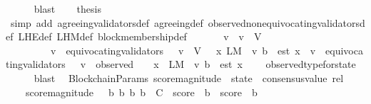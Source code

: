 \begin{isabellebody}
\ \ \ \ \isamarkupfalse%
\ blast\isanewline
\ \ \isamarkupfalse%
\ {\isacharquery}thesis\isanewline
\ \ \ \ \isamarkupfalse%
\ {\isacharparenleft}simp\ add{\isacharcolon}\ agreeing{\isacharunderscore}validators{\isacharunderscore}def\ agreeing{\isacharunderscore}def\ observed{\isacharunderscore}non{\isacharunderscore}equivocating{\isacharunderscore}validators{\isacharunderscore}def\ L{\isacharunderscore}H{\isacharunderscore}E{\isacharunderscore}def\ L{\isacharunderscore}H{\isacharunderscore}M{\isacharunderscore}def\ block{\isacharunderscore}membership{\isacharunderscore}def{\isacharparenright}\isanewline
\ \ \ \ \isamarkupfalse%
\ {\isacartoucheopen}{\isasymforall}\ v\ {\isasymsigma}{\isachardot}\ v\ {\isasymin}\ V\ {\isasymand}\ {\isasymsigma}\ {\isasymin}\ {\isasymSigma}\isanewline
\ \ \ \ \ \ \ \ {\isasymlongrightarrow}\ {\isacharparenleft}v\ {\isasymnotin}\ equivocating{\isacharunderscore}validators\ {\isasymsigma}\ {\isasymlongrightarrow}\ v\ {\isasymin}\ V\ {\isasymand}\ {\isacharparenleft}{\isasymexists}\ x\ {\isasymin}L{\isacharunderscore}M\ {\isasymsigma}\ v{\isachardot}\ b\ {\isasymdownharpoonright}\ est\ x{\isacharparenright}{\isacharparenright}\ {\isacharequal}\ {\isacharparenleft}v\ {\isasymnotin}\ equivocating{\isacharunderscore}validators\ {\isasymsigma}\ {\isasymlongrightarrow}\ v\ {\isasymin}\ observed\ {\isasymsigma}\ {\isasymand}\ {\isacharparenleft}{\isasymforall}\ x\ {\isasymin}\ L{\isacharunderscore}M\ {\isasymsigma}\ v{\isachardot}\ b\ {\isasymdownharpoonright}\ est\ x{\isacharparenright}{\isacharparenright}{\isacartoucheclose}\isanewline
\ \ \ \ observed{\isacharunderscore}type{\isacharunderscore}for{\isacharunderscore}state\isanewline
\ \ \ \ \isamarkupfalse%
\ blast\isanewline
{}\isamarkupfalse%
%
\endisatagproof
{\isafoldproof}%
%
\isadelimproof
\isanewline
%
\endisadelimproof
\isanewline
{}\isamarkupfalse%
\ {\isacharparenleft}\ BlockchainParams{\isacharparenright}\ score{\isacharunderscore}magnitude\ {\isacharcolon}{\isacharcolon}\ {\isachardoublequoteopen}state\ {\isasymRightarrow}\ consensus{\isacharunderscore}value\ rel{\isachardoublequoteclose}\isanewline
\ \ \ \isanewline
\ \ \ \ {\isachardoublequoteopen}score{\isacharunderscore}magnitude\ {\isasymsigma}\ {\isacharequal}\ {\isacharbraceleft}{\isacharparenleft}b{}{\isacharcomma}\ b{}{\isacharparenright}{\isachardot}\ {\isacharbraceleft}b{}{\isacharcomma}\ b{}{\isacharbraceright}\ {\isasymsubseteq}\ C\ {\isasymand}\ score\ {\isasymsigma}\ b{}\ {\isasymle}\ score\ {\isasymsigma}\ b{}{\isacharbraceright}{\isachardoublequoteclose}\ \isanewline

\end{isabellebody}
